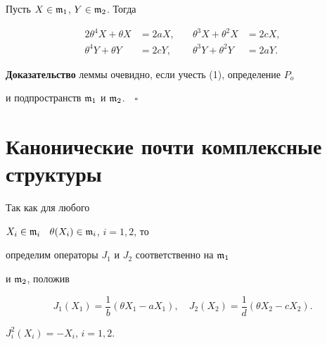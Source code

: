 \begin{lem}


Пусть $X \in \frak{m}_1$, $Y\in \frak{m}_2$. Тогда


\begin{alignat}{2}\label{11}


\theta^4X+\theta X&=2aX, &\quad \theta^3X+\theta^2X&=2cX, \\


%


\label{12}


\theta^4Y+\theta Y&=2cY, &\quad \theta^3Y+\theta^2Y&=2aY.


\end{alignat}


\end{lem}





{\bf Доказательство} леммы очевидно, если учесть (1), определение $P_o$


и подпространств $\frak{m}_1$ и $\frak{m}_2$.$\quad\square$





\section{Канонические почти комплексные структуры}





Так как для любого


$X_i\in \frak{m}_i$ \ $\theta (X_i)\in \frak{m}_i$, $i=1,2$, то


определим операторы $J_1$ и $J_2$ соответственно на $\frak{m}_1$


и $\frak{m}_2$, положив


\begin{equation}\label{13}


J_1(X_1)=\frac{1}{b}(\theta X_1-aX_1),\quad


J_2(X_2)=\frac{1}{d}(\theta X_2-cX_2).


\end{equation}





\begin{lem}


$J^2_i(X_i)=-X_i$, $i=1,2$.


\end{lem}





